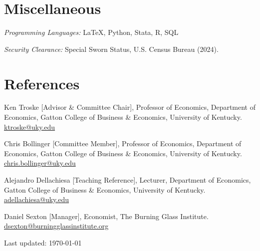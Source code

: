 \documentclass[letterpaper]{article}
\def\footerlink{http://jblevins.org/projects/cv-template/}
\renewenvironment{itemize}{
  \begin{list}{}{
    \setlength{\leftmargin}{1.5em}
  }
}{
  \end{list}
}
\begin{document}
\section*{Miscellaneous}

\begin{itemize}
\item \textit{Programming Languages:}  \LaTeX, Python, Stata, R, SQL
\item \textit{Security Clearance:} Special Sworn Status, U.S. Census Bureau (2024).
\end{itemize}

\section*{References}

\begin{itemize}
\item Ken Troske [Advisor \& Committee Chair], Professor of Economics, Department of Economics, Gatton College of Business \& Economics, University of Kentucky. \href{mailto:ktroske@uky.edu}{ktroske@uky.edu}
\item Chris Bollinger [Committee Member], Professor of Economics, Department of Economics, Gatton College of Business \& Economics, University of Kentucky. \href{mailto:chris.bollinger@uky.edu}{chris.bollinger@uky.edu}
\item Alejandro Dellachiesa [Teaching Reference], Lecturer, Department of Economics, Gatton College of Business \& Economics, University of Kentucky. \href{mailto:adellachiesa@uky.edu}{adellachiesa@uky.edu}
\item Daniel Sexton [Manager], Economist, The Burning Glass Institute. \href{mailto:dsexton@burningglassinstitute.org}{dsexton@burningglassinstitute.org}
\end{itemize}

\vfill

\begin{center}
  \begin{footnotesize}
    Last updated: \today \\
  \end{footnotesize}
\end{center}
\end{document}
